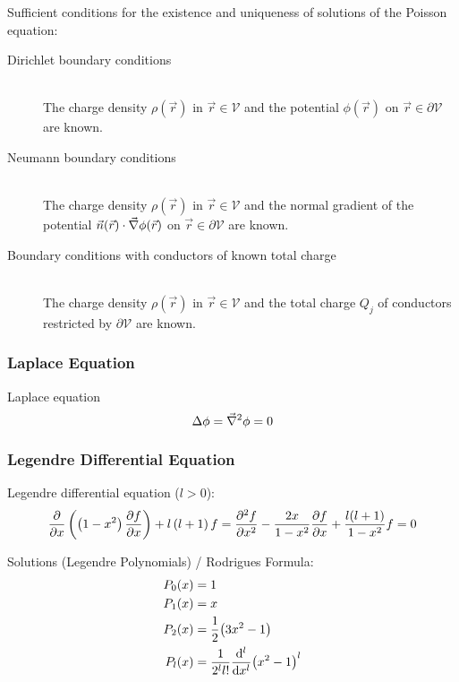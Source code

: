 			\noindent
			Sufficient conditions for the existence and uniqueness of solutions of the Poisson equation:
			\begin{description}
				\item[Dirichlet boundary conditions]\hfill \\
					The charge density $\rho(\vec{r})$ in $\vec{r}\in\mathcal{V}$ and the potential $\phi(\vec{r})$ on $\vec{r}\in\partial\mathcal{V}$ are known.
				\item[Neumann boundary conditions]\hfill \\
					The charge density  $\rho(\vec{r})$ in $\vec{r}\in\mathcal{V}$ and the normal gradient of the potential  $\vec{n}(\vec{r})\cdot\vec{\nabla}\phi(\vec{r})$ on $\vec{r}\in\partial\mathcal{V}$ are known.
				\item[Boundary conditions with conductors of known total charge]\hfill \\
					The charge density $\rho(\vec{r})$ in $\vec{r}\in\mathcal{V}$ and the total charge $Q_j$ of conductors restricted by $\partial\mathcal{V}$ are known.
			\end{description}

		\subsubsection{Laplace Equation}
			\noindent
			Laplace equation
			\begin{equation}
				\Delta\phi=\vec{\nabla}^2\phi = 0
			\end{equation}

		\subsubsection{Legendre Differential Equation}
			\noindent
			Legendre differential equation ($l>0$):
			\begin{equation}
				\pdv{x}\left(\left(1-x^2\right)\pdv{f}{x}\right)+l\left(l+1\right)f
				= \frac{\partial^2 f}{\partial x^2} - \frac{2x}{1-x^2}\pdv{f}{x} + \frac{l(l+1)}{1-x^2}f = 0
			\end{equation}

			\noindent
			Solutions (Legendre Polynomials) / Rodrigues Formula:
			\begin{equation} \label{Eq:LegendrePolynomials}
				\begin{aligned}
					P_0(x) &= 1 \\
					P_1(x) &= x \\
					P_2(x) &= \frac{1}{2}\qty(3x^2-1) \\
					P_l(x) &= \frac{1}{2^l l!}\dv[l]{x}\qty(x^2-1)^l \\
				\end{aligned}
			\end{equation}

